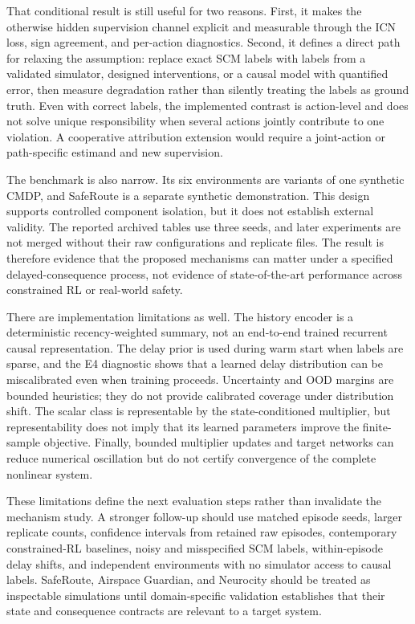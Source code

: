 \documentclass[10pt]{article}
\begin{document}
That conditional result is still useful for two reasons. First, it makes the
otherwise hidden supervision channel explicit and measurable through the ICN
loss, sign agreement, and per-action diagnostics. Second, it defines a direct
path for relaxing the assumption: replace exact SCM labels with labels from a
validated simulator, designed interventions, or a causal model with quantified
error, then measure degradation rather than silently treating the labels as
ground truth. Even with correct labels, the implemented contrast is action-level
and does not solve unique responsibility when several actions jointly
contribute to one violation. A cooperative attribution extension would require
a joint-action or path-specific estimand and new supervision.

The benchmark is also narrow. Its six environments are variants of one
synthetic CMDP, and SafeRoute is a separate synthetic demonstration. This
design supports controlled component isolation, but it does not establish
external validity. The reported archived tables use three seeds, and later
experiments are not merged without their raw configurations and replicate
files. The result is therefore evidence that the proposed mechanisms can
matter under a specified delayed-consequence process, not evidence of
state-of-the-art performance across constrained RL or real-world safety.

There are implementation limitations as well. The history encoder is a
deterministic recency-weighted summary, not an end-to-end trained recurrent
causal representation. The delay prior is used during warm start when labels
are sparse, and the E4 diagnostic shows that a learned delay distribution can
be miscalibrated even when training proceeds. Uncertainty and OOD margins are
bounded heuristics; they do not provide calibrated coverage under distribution
shift. The scalar class is representable by the state-conditioned multiplier,
but representability does not imply that its learned parameters improve the
finite-sample objective. Finally, bounded multiplier updates and target
networks can reduce numerical oscillation but do not certify convergence of
the complete nonlinear system.

These limitations define the next evaluation steps rather than invalidate the
mechanism study. A stronger follow-up should use matched episode seeds,
larger replicate counts, confidence intervals from retained raw episodes,
contemporary constrained-RL baselines, noisy and misspecified SCM labels,
within-episode delay shifts, and independent environments with no simulator
access to causal labels. SafeRoute, Airspace Guardian, and Neurocity should be
treated as inspectable simulations until domain-specific validation establishes
that their state and consequence contracts are relevant to a target system.
\end{document}
